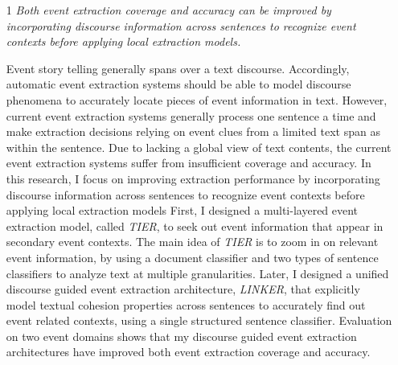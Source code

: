   \begin{enumerate}
    \item[1] {\em{Both event extraction coverage and accuracy can be improved by 
    incorporating discourse information across sentences 
    to recognize event contexts before applying local extraction models.}}

Event story telling generally spans over a text discourse. Accordingly, automatic event extraction systems should be able to 
 model discourse phenomena to accurately locate pieces of event information in text. 
However, current event extraction systems generally process one sentence a time and make extraction decisions relying on event clues 
from a limited text span as within the sentence.
Due to lacking a global view of text contents, the current event extraction systems suffer from insufficient coverage and accuracy. 
In this research, I focus on 
improving extraction performance by incorporating discourse information across sentences 
to recognize event contexts before applying local extraction models
First, I designed a multi-layered event extraction model, called {\it TIER}, 
to seek out event information that appear in secondary event contexts. 
The main idea of {\it TIER} is to zoom in on relevant event information, 
by using a document classifier and two types of sentence classifiers to analyze text 
at multiple granularities.
Later, I designed a 
unified discourse guided event extraction architecture, {\it LINKER}, 
that explicitly model textual cohesion properties across sentences
 to accurately find out event related contexts, using a single structured sentence classifier. 
Evaluation on two event domains shows that my discourse guided event extraction architectures have improved both 
event extraction coverage and accuracy.


\end{enumerate}
